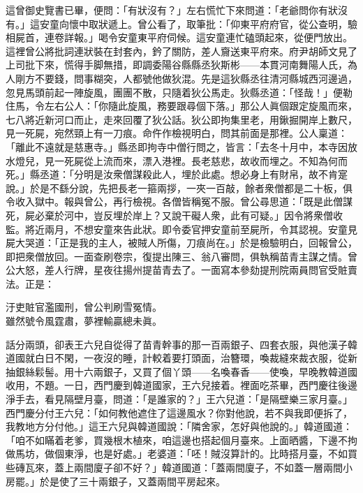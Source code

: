 這曾御史覽書已畢，便問：「有狀沒有？」左右慌忙下來問道：「老爺問你有狀沒有。」這安童向懷中取狀遞上。曾公看了，取筆批：「仰東平府府官，從公查明，驗相屍首，連卷詳報。」喝令安童東平府伺候。這安童連忙磕頭起來，從便門放出。這裡曾公將批詞連狀裝在封套內，鈐了關防，差人齎送東平府來。府尹胡師文見了上司批下來，慌得手脚無措，即調委陽谷縣縣丞狄斯彬——本貫河南舞陽人氏，為人剛方不要錢，問事糊突，人都號他做狄混。先是這狄縣丞往清河縣城西河邊過，忽見馬頭前起一陣旋風，團團不散，只隨着狄公馬走。狄縣丞道：「怪哉！」便勒住馬，令左右公人：「你隨此旋風，務要跟尋個下落。」{}那公人眞個跟定旋風而來，七八將近新河口而止，走來回覆了狄公話。狄公即拘集里老，用鍬掘開岸上數尺，見一死屍，宛然頸上有一刀痕。命仵作檢視明白，問其前面是那裡。公人稟道：「離此不遠就是慈惠寺。」縣丞即拘寺中僧行問之，皆言：「去冬十月中，本寺因放水燈兒，見一死屍從上流而來，漂入港裡。長老慈悲，故收而埋之。不知為何而死。」縣丞道：「分明是汝衆僧謀殺此人，埋於此處。想必身上有財帛，故不肯寔說。」於是不繇分說，先把長老一箍兩拶，一夾一百敲，餘者衆僧都是二十板，{}俱令收入獄中。報與曾公，再行檢視。各僧皆稱冤不服。曾公尋思道：「既是此僧謀死，屍必棄於河中，豈反埋於岸上？又說干礙人衆，此有可疑。」因令將衆僧收監。將近兩月，不想安童來告此狀。即令委官押安童前至屍所，令其認視。安童見屍大哭道：「正是我的主人，被賊人所傷，刀痕尚在。」於是檢驗明白，回報曾公，即把衆僧放回。一面查刷卷宗，復提出陳三、翁八審問，俱執稱苗青主謀之情。曾公大怒，差人行牌，星夜往揚州提苗青去了。一面寫本參劾提刑院兩員問官受賍賣法。正是：

\begin{myquote}
汙吏賍官濫國刑，曾公判刷雪冤情。\\雖然號令風霆肅，夢裡輸贏總未眞。
\end{myquote}

話分兩頭，卻表王六兒自從得了苗青幹事的那一百兩銀子、四套衣服，與他漢子韓道國就白日不閑，一夜沒的睡，計較着要打頭面，治簪環，喚裁縫來裁衣服，從新抽銀絲鬏髻。用十六兩銀子，又買了個丫頭——名喚春香——使喚，早晚教韓道國收用，不題。{}一日，西門慶到韓道國家，王六兒接着。裡面吃茶畢，西門慶往後邊淨手去，看見隔壁月臺，問道：「是誰家的？」王六兒道：「是隔壁樂三家月臺。」西門慶分付王六兒：「如何教他遮住了這邊風水？你對他說，若不與我即便拆了，我教地方分付他。」這王六兒與韓道國說：「隣舍家，怎好與他說的。」韓道國道：「咱不如瞞着老爹，買幾根木植來，咱這邊也搭起個月臺來。上面晒醬，下邊不拘做馬坊，做個東淨，也是好處。」老婆道：「呸！賊沒算計的。比時搭月臺，不如買些磚瓦來，蓋上兩間廈子卻不好？」韓道國道：「蓋兩間廈子，不如蓋一層兩間小房罷。」於是使了三十兩銀子，又蓋兩間平房起來。

